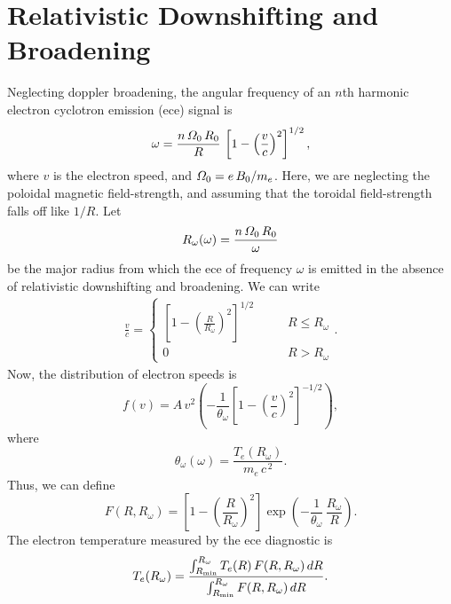 \documentclass[12pt,prb,aps,notitlepage]{revtex4-1}
\begin{document}
\section{Relativistic Downshifting and Broadening}
Neglecting doppler broadening, the angular frequency of an $n$th harmonic electron cyclotron emission (ece) signal is
\begin{equation}
\omega = \frac{n\,{\mit\Omega}_0\,R_0}{R}\,\left[1-\left(\frac{v}{c}\right)^2\right]^{1/2},
\end{equation}
where $v$ is the electron speed, and ${\mit\Omega}_0=e\,B_0/m_e$. Here, we are neglecting the poloidal magnetic field-strength, and assuming that the toroidal
field-strength falls off like $1/R$. Let
\begin{equation}
R_\omega(\omega) = \frac{n\,{\mit\Omega}_0\,R_0}{\omega}
\end{equation}
be the major radius from which the ece of frequency $\omega$ is emitted  in the absence of relativistic downshifting and broadening. We can write
\begin{align}
\frac{v}{c} =\left\{\begin{array}{ccc}\left[1-\left(\frac{R}{R_\omega}\right)^2\right]^{1/2} &~~~~~&R\leq R_\omega\\[0.5ex]
0&&R>R_\omega
\end{array}\right..
\end{align}
Now, the distribution of electron speeds is
\begin{equation}
f(v)= A\,v^2\left(-\frac{1}{\theta_\omega}\left[1-\left(\frac{v}{c}\right)^2\right]^{-1/2}\right),
\end{equation}
where
\begin{equation}
\theta_\omega(\omega) = \frac{T_e(R_\omega)}{m_e\,c^{\,2}}.
\end{equation}
Thus, we can define
\begin{equation}
F(R,R_\omega) = \left[1-\left(\frac{R}{R_\omega}\right)^2\right]\exp\!\left(-\frac{1}{\theta_\omega}\,\frac{R_\omega}{R}\right).
\end{equation}
The electron temperature measured by the ece diagnostic is
\begin{equation}
T_e(R_\omega) = \frac{\int_{R_{\rm min}}^{R_\omega} T_e(R)\,F(R,R_\omega)\,dR}  {\int_{R_{\rm min}}^{R_\omega} F(R,R_\omega)\,dR}.
\end{equation}
\end{document}
